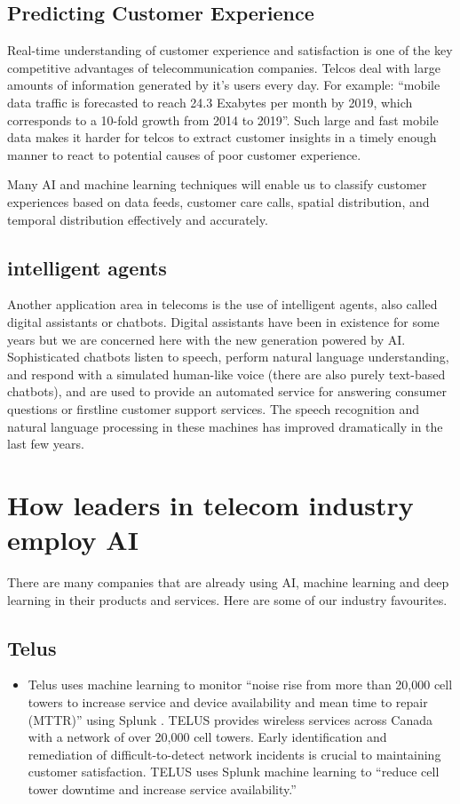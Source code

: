 \documentclass[12pt]{article}
\begin{document}
\subsection{Predicting Customer Experience}
\noindent Real-time understanding of customer experience and satisfaction is one of the key competitive advantages of telecommunication companies. Telcos deal with large amounts of information generated by it’s users every day. For example: “mobile data traffic is forecasted to reach 24.3 Exabytes per month by 2019, which corresponds to a 10-fold growth from 2014 to 2019”. Such large and fast mobile data makes it harder for telcos to extract customer insights in a timely enough manner to react to potential causes of poor customer experience. \cite{churn2}

Many AI and machine learning techniques will enable us to classify customer experiences based on data feeds, customer care calls, spatial distribution, and temporal distribution effectively and accurately.


\subsection{intelligent agents}
\noindent Another application area in telecoms is the use of intelligent agents, also called digital assistants or
chatbots. Digital assistants have been in existence for some years but we are concerned here with the
new generation powered by AI. Sophisticated chatbots listen to speech, perform natural language
understanding, and respond with a simulated human-like voice (there are also purely text-based
chatbots), and are used to provide an automated service for answering consumer questions or firstline
customer support services. The speech recognition and natural language processing in these
machines has improved dramatically in the last few years.

\section{How leaders in telecom industry employ AI}
\noindent There are many companies that are already using AI, machine learning and deep learning in their products and services. Here are some of our industry favourites.

\subsection{Telus}
\begin{itemize}
	\item Telus uses machine learning to monitor “noise rise from more than 20,000 cell towers to increase service and device availability and mean time to repair (MTTR)” using Splunk . TELUS provides wireless services across Canada with a network of over 20,000 cell towers. Early identification and remediation of difficult-to-detect network incidents is crucial to maintaining customer satisfaction. TELUS uses Splunk machine learning to “reduce cell tower downtime and increase service availability.” \cite{splunk}
\end{itemize}
\end{document}
